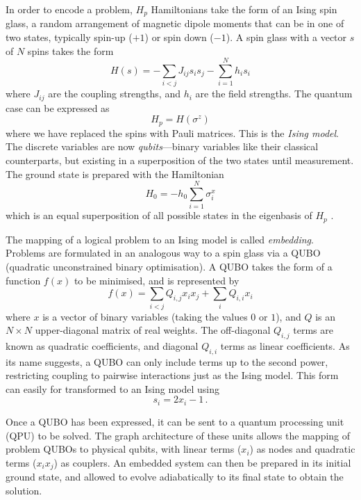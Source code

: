 \documentclass[aps,pra,10pt,twocolumn]{revtex4-2}
\begin{document}
In order to encode a problem, $H_p$ Hamiltonians take the form of an Ising spin glass, a random arrangement of magnetic dipole moments that can be in one of two states, typically spin-up ($+1$) or spin down ($-1$). A spin glass with a vector $s$ of $N$ spins takes the form
\begin{equation}
    H(s) = -\sum_{i<j}J_{ij}s_i s_j - \sum_{i=1}^{N}h_i s_i
    \label{eq:ising}
\end{equation}
where $J_{ij}$ are the coupling strengths, and $h_i$ are the field strengths. The quantum case can be expressed as
\begin{equation}
    H_p = H(\sigma^z)
\end{equation}
where we have replaced the spins with Pauli matrices. This is the \textit{Ising model}. The discrete variables are now \textit{qubits}—binary variables like their classical counterparts, but existing in a superposition of the two states until measurement. The ground state is prepared with the Hamiltonian 
\begin{equation}
    H_0 = -h_0\sum_{i=1}^{N}\sigma_i^x
\end{equation}
which is an equal superposition of all possible states in the eigenbasis of $H_p$ \cite{lucas_ising_2014}.

The mapping of a logical problem to an Ising model is called \textit{embedding}. Problems are formulated in an analogous way to a spin glass via a QUBO (quadratic unconstrained binary optimisation). A QUBO takes the form of a function $f(x)$ to be minimised, and is represented by
\begin{equation}
    f(x)=\sum_{i<j}Q_{i,j}x_ix_j + \sum_iQ_{i,i}x_i
    \label{eq:QUBO}
\end{equation}
where $x$ is a vector of binary variables (taking the values $0$ or $1$), and $Q$ is an $N\times N$ upper-diagonal matrix of real weights. The off-diagonal $Q_{i,j}$ terms are known as quadratic coefficients, and diagonal $Q_{i,i}$ terms as linear coefficients. As its name suggests, a QUBO can only include terms up to the second power, restricting coupling to pairwise interactions just as the Ising model.
This form can easily for transformed to an Ising model using
\begin{equation}
    s_i = 2x_i - 1 \,.
    \label{eq:qubo-ising}
\end{equation}

Once a QUBO has been expressed, it can be sent to a quantum processing unit (QPU) to be solved. The graph architecture of these units allows the mapping of problem QUBOs to physical qubits, with linear terms ($x_i$) as nodes and quadratic terms ($x_ix_j$) as couplers. An embedded system can then be prepared in its initial ground state, and allowed to evolve adiabatically to its final state to obtain the solution.
\end{document}
